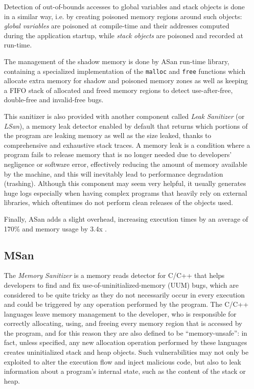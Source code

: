 Detection of out-of-bounds accesses to global variables and stack objects is done in a similar way, i.e. by creating poisoned memory regions around such objects: \textit{global variables} are poisoned at compile-time and their addresses computed during the application startup, while \textit{stack objects} are poisoned and recorded at run-time.

The management of the shadow memory is done by ASan run-time library, containing a specialized implementation of the \verb|malloc| and \verb|free| functions which allocate extra memory for shadow and poisoned memory zones as well as keeping a FIFO stack of allocated and freed memory regions to detect use-after-free, double-free and invalid-free bugs.

This sanitizer is also provided with another component called \textit{Leak Sanitizer} (or \textit{LSan}), a memory leak detector enabled by default that returns which portions of the program are leaking memory as well as the size leaked, thanks to comprehensive and exhaustive stack traces. A memory leak is a condition where a program fails to release memory that is no longer needed due to developers' negligence or software error, effectively reducing the amount of memory available by the machine, and this will inevitably lead to performance degradation (trashing). Although this component may seem very helpful, it usually generates huge logs especially when having complex programs that heavily rely on external libraries, which oftentimes do not perform clean releases of the objects used.

Finally, ASan adds a slight overhead, increasing execution times by an average of 170\% and memory usage by 3.4x \cite{serebryany2012addresssanitizer}.





\subsection{MSan}
The \textit{Memory Sanitizer} \cite{stepanov2015memorysanitizer} is a memory reads detector for C/C++ that helps developers to find and fix use-of-uninitialized-memory (UUM) bugs, which are considered to be quite tricky as they do not necessarily occur in every execution and could be triggered by any operation performed by the program. The C/C++ languages leave memory management to the developer, who is responsible for correctly allocating, using, and freeing every memory region that is accessed by the program, and for this reason they are also defined to be ``memory-unsafe'': in fact, unless specified, any new allocation operation performed by these languages creates uninitialized stack and heap objects. Such vulnerabilities may not only be exploited to alter the execution flow and inject malicious code, but also to leak information about a program's internal state, such as the content of the stack or heap.

